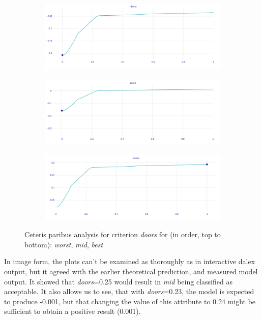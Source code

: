 \documentclass[../main.tex]{subfiles}
\begin{document}
\begin{figure}
    \centering
    \begin{subfigure}[b]{\linewidth}
        \makeatletter{}\makeatother
        \includegraphics[width=\linewidth]{../img/doors_worst.png}
        \label{fig:UTA-ceteris-paribus-doors}
    \end{subfigure}
    \begin{subfigure}[b]{\linewidth}
        \includegraphics[width=\linewidth]{../img/doors_medium.png}
    \end{subfigure}
    \begin{subfigure}[b]{\linewidth}
        \includegraphics[width=\linewidth]{../img/doors_best.png}
    \end{subfigure}
    \caption{Ceteris paribus analysis for criterion \emph{doors} for (in order, top to bottom): \emph{worst}, \emph{mid}, \emph{best}}
\end{figure}

In image form, the plots can't be examined as thoroughly as in interactive dalex output, but it agreed
with the earlier theoretical prediction, and measured model output. It showed that \emph{doors}=0.25 would result
in \emph{mid} being classified as acceptable. It also allows us to see, that with \emph{doors}=0.23, the
model is expected to produce -0.001, but that changing the value of this attribute to 0.24 might be sufficient to
obtain a positive result (0.001).
\end{document}
